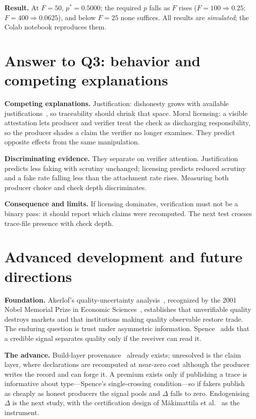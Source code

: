 \textbf{Result.} At $F=50$, $p^{*}=0.5000$; the required $p$ falls as $F$ rises ($F=100\Rightarrow0.25$; $F=400\Rightarrow0.0625$), and below $F=25$ none suffices. All results are \emph{simulated}; the Colab notebook reproduces them.

\section{Answer to Q3: behavior and competing explanations}
\textbf{Competing explanations.} Justification: dishonesty grows with available justifications~\cite{shalvi2012}, so traceability should shrink that space. Moral licensing: a visible attestation lets producer and verifier treat the check as discharging responsibility, so the producer shades a claim the verifier no longer examines. They predict opposite effects from the same manipulation.

\textbf{Discriminating evidence.} They separate on verifier attention. Justification predicts less faking with scrutiny unchanged; licensing predicts reduced scrutiny and a fake rate falling less than the attachment rate rises. Measuring both producer choice and check depth discriminates.

\textbf{Consequence and limits.} If licensing dominates, verification must not be a binary pass: it should report which claims were recomputed. The next test crosses trace-file presence with check depth.

\section{Advanced development and future directions}
\textbf{Foundation.} Akerlof's quality-uncertainty analysis~\cite{akerlof1970}, recognized by the 2001 Nobel Memorial Prize in Economic Sciences~\cite{nobel2001}, establishes that unverifiable quality destroys markets and that institutions making quality observable restore trade. The enduring question is trust under asymmetric information. Spence~\cite{spence1973} adds that a credible signal separates quality only if the receiver can read it.

\textbf{The advance.} Build-layer provenance~\cite{slsa} already exists; unresolved is the claim layer, where declarations are recomputed at near-zero cost although the producer writes the record and can forge it. A premium exists only if publishing a trace is informative about type---Spence's single-crossing condition---so if fakers publish as cheaply as honest producers the signal pools and $\Delta$ falls to zero. Endogenising $\Delta$ is the next study, with the certification design of M{\"a}kimattila et al.~\cite{makimattila2025} as the instrument.


